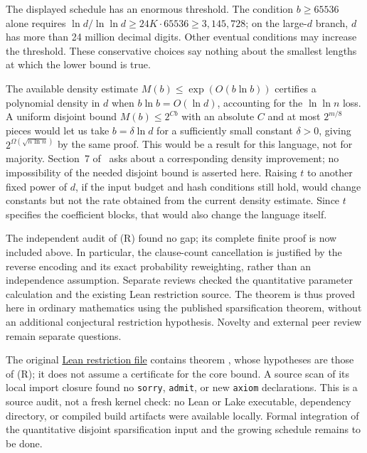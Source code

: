 \documentclass[11pt]{article}
\begin{document}
The displayed schedule has an enormous threshold. The condition
$b\ge65536$ alone requires
$\ln d/\ln\ln d\ge24K\cdot65536\ge3{,}145{,}728$; on the large-$d$
branch, $d$ has more than 24 million decimal digits. Other eventual
conditions may increase the threshold. These conservative choices say
nothing about the smallest lengths at which the lower bound is true.

The available density estimate $M(b)\le\exp(O(b\ln b))$ certifies a
polynomial density in $d$ when $b\ln b=O(\ln d)$, accounting for the
$\ln\ln n$ loss. A uniform disjoint bound $M(b)\le2^{Cb}$ with an
absolute $C$ and at most $2^{m/8}$ pieces would let us take
$b=\delta\ln d$ for a sufficiently small constant $\delta>0$, giving
$2^{\Omega(\sqrt{n\ln n})}$ by the same proof. This would be a result
for this language, not for majority. Section~7 of~\cite{CIP} asks about
a corresponding density improvement; no impossibility of the needed
disjoint bound is asserted here. Raising $t$ to another fixed power
of $d$, if the input budget and hash conditions still hold, would change
constants but not the rate obtained from the current density estimate.
Since $t$ specifies the coefficient blocks, that would also change the
language itself.

The independent audit of (R) found no gap; its complete finite proof is now
included above. In particular, the clause-count cancellation is justified
by the reverse encoding and its exact probability reweighting, rather than
an independence assumption. Separate reviews checked the quantitative
parameter calculation and the existing Lean restriction source.
The theorem is thus proved here in ordinary mathematics using the published
sparsification theorem, without an additional conjectural restriction
hypothesis. Novelty and external peer review remain separate questions.

The original
\href{https://github.com/openai/math/blob/adc7f1241b42e322a6451854ab7e4b4c146bf78a/lean/OAI/Computability/DepthThree/Restriction.lean}{Lean restriction file}
contains theorem , whose hypotheses are those
of (R); it does not assume a certificate for the core bound. A source scan
of its local import closure found no \texttt{sorry}, \texttt{admit}, or
new \texttt{axiom} declarations. This is a source audit, not a fresh kernel
check: no Lean or Lake executable, dependency directory, or compiled build
artifacts were available locally. Formal integration of the quantitative
disjoint sparsification input and the growing schedule remains to be done.
\end{document}
